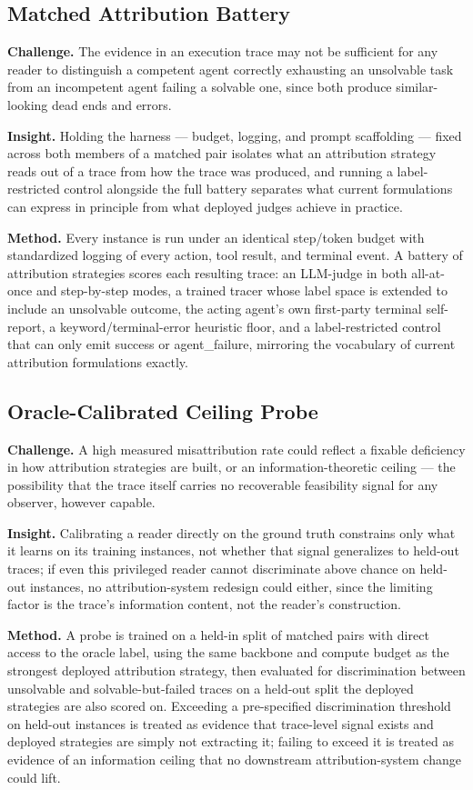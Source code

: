 \documentclass[11pt]{article}
\begin{document}
\subsection{Matched Attribution Battery}
\textbf{Challenge.} The evidence in an execution trace may not be sufficient for any reader to distinguish a competent agent correctly exhausting an unsolvable task from an incompetent agent failing a solvable one, since both produce similar-looking dead ends and errors.

\textbf{Insight.} Holding the harness --- budget, logging, and prompt scaffolding --- fixed across both members of a matched pair isolates what an attribution strategy reads out of a trace from how the trace was produced, and running a label-restricted control alongside the full battery separates what current formulations can express in principle from what deployed judges achieve in practice.

\textbf{Method.} Every instance is run under an identical step/token budget with standardized logging of every action, tool result, and terminal event. A battery of attribution strategies scores each resulting trace: an LLM-judge in both all-at-once and step-by-step modes, a trained tracer whose label space is extended to include an unsolvable outcome, the acting agent's own first-party terminal self-report, a keyword/terminal-error heuristic floor, and a label-restricted control that can only emit success or agent\_failure, mirroring the vocabulary of current attribution formulations exactly.

\subsection{Oracle-Calibrated Ceiling Probe}
\textbf{Challenge.} A high measured misattribution rate could reflect a fixable deficiency in how attribution strategies are built, or an information-theoretic ceiling --- the possibility that the trace itself carries no recoverable feasibility signal for any observer, however capable.

\textbf{Insight.} Calibrating a reader directly on the ground truth constrains only what it learns on its training instances, not whether that signal generalizes to held-out traces; if even this privileged reader cannot discriminate above chance on held-out instances, no attribution-system redesign could either, since the limiting factor is the trace's information content, not the reader's construction.

\textbf{Method.} A probe is trained on a held-in split of matched pairs with direct access to the oracle label, using the same backbone and compute budget as the strongest deployed attribution strategy, then evaluated for discrimination between unsolvable and solvable-but-failed traces on a held-out split the deployed strategies are also scored on. Exceeding a pre-specified discrimination threshold on held-out instances is treated as evidence that trace-level signal exists and deployed strategies are simply not extracting it; failing to exceed it is treated as evidence of an information ceiling that no downstream attribution-system change could lift.
\end{document}
